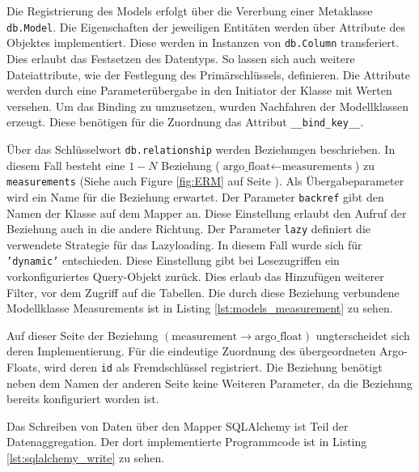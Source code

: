 Die Registrierung des Models erfolgt über die Vererbung einer Metaklasse \texttt{db.Model}. Die Eigenschaften der jeweiligen Entitäten werden über Attribute des Objektes implementiert. Diese werden in Instanzen von \texttt{db.Column} transferiert. Dies erlaubt das Festsetzen des Datentyps. So lassen sich auch weitere Dateiattribute, wie der Festlegung des  Primärschlüssels, definieren. Die Attribute werden durch eine Parameterübergabe in den Initiator der Klasse mit Werten versehen.  
Um das Binding zu umzusetzen, wurden Nachfahren der Modellklassen erzeugt. Diese benötigen für die Zuordnung das Attribut \texttt{\_\_bind\_key\_\_}.

Über das Schlüsselwort \texttt{db.relationship} werden Beziehungen beschrieben. In diesem Fall besteht eine $1 - N$ Beziehung ($\mbox{argo\_float} \leftarrow \mbox{measurements}$) zu \texttt{measurements} (Siehe auch Figure \ref{fig:ERM} auf Seite \pageref{fig:ERM}). Als Übergabeparameter wird ein Name für die Beziehung erwartet. Der Parameter \texttt{backref} gibt den Namen der Klasse auf dem Mapper an. Diese Einstellung erlaubt den Aufruf der Beziehung auch in die andere Richtung. Der Parameter \texttt{lazy} definiert die verwendete Strategie für das Lazyloading. In diesem Fall wurde sich für \texttt{'dynamic'} entschieden. Diese Einstellung gibt bei Lesezugriffen ein vorkonfiguriertes Query-Objekt zurück. Dies erlaub das Hinzufügen weiterer Filter, vor dem Zugriff auf die Tabellen. Die durch diese Beziehung verbundene Modellklasse Measurements ist in Listing \ref{lst:models_measurement} zu sehen.


Auf dieser Seite der Beziehung   $\left( \mbox{measurement} \to \mbox{argo\_float} \right)$ ungterscheidet sich deren Implementierung. Für die eindeutige Zuordnung des übergeordneten Argo-Floats, wird deren \texttt{id} als Fremdschlüssel registriert. Die Beziehung benötigt neben dem Namen der anderen Seite keine Weiteren Parameter, da die Beziehung bereits konfiguriert worden ist.




Das Schreiben von Daten über den Mapper SQLAlchemy ist Teil der Datenaggregation. Der dort implementierte Programmcode ist in Listing \ref{lst:sqlalchemy_write} zu sehen.


